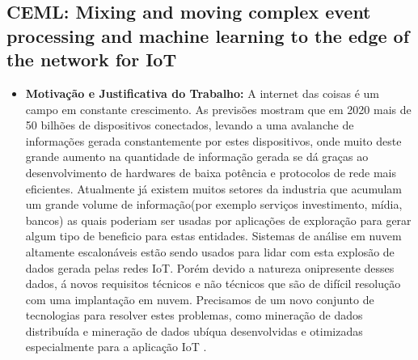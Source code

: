 \documentclass[tid,table]{texufpel} %
\begin{document}
\subsection{CEML: Mixing and moving complex event processing and machine learning to the edge of the network for IoT}

\begin{itemize}
	\item \textbf{Motivação e Justificativa do Trabalho:} A internet das coisas é um campo em constante crescimento. As previsões mostram que em 2020 mais de 50 bilhões de dispositivos conectados, levando a uma avalanche de informações gerada constantemente por estes dispositivos, onde muito deste grande aumento na quantidade de informação gerada se dá graças ao desenvolvimento de hardwares de baixa potência e protocolos de rede mais eficientes. Atualmente já existem muitos setores da industria que acumulam um grande volume de informação(por exemplo serviços investimento, mídia, bancos) as quais poderiam ser usadas por aplicações de exploração para gerar algum tipo de beneficio para estas entidades. Sistemas de análise em nuvem altamente escalonáveis estão sendo usados para lidar com esta explosão de dados gerada pelas redes IoT. Porém devido a natureza onipresente desses dados, á novos requisitos técnicos e não técnicos que são de difícil resolução com uma implantação em nuvem. Precisamos de um novo conjunto de tecnologias para resolver estes problemas, como mineração de dados distribuída e mineração de dados ubíqua desenvolvidas e otimizadas especialmente para a aplicação IoT \cite{art10soto2016ceml}.
	

\end{itemize}
\end{document}
